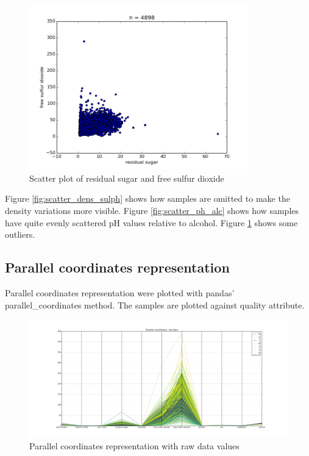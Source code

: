 \documentclass[12pt]{article}
\begin{document}
\begin{figure}[H]
    \centering
    \includegraphics[width=0.85\textwidth]{scatter_plot_residual_sugar_free_sulfur_dioxide}
    \caption{Scatter plot of residual sugar and free sulfur dioxide}
    \label{fig:scatter_rs_fsd}
\end{figure}

Figure \ref{fig:scatter_dens_sulph} shows how samples are omitted to make the density variations more visible. Figure \ref{fig:scatter_ph_alc} shows how samples have quite evenly scattered pH values relative to alcohol. Figure \ref{fig:scatter_rs_fsd} shows some outliers.

\subsection{Parallel coordinates representation}

Parallel coordinates representation were plotted with pandas' parallel\_coordinates method. The samples are plotted against quality attribute.

\begin{figure}[H]
    \centering
    \includegraphics[width=1\textwidth]{parallel_raw}
    \caption{Parallel coordinates representation with raw data values}
    \label{fig:parallel_raw}
\end{figure}
\end{document}
